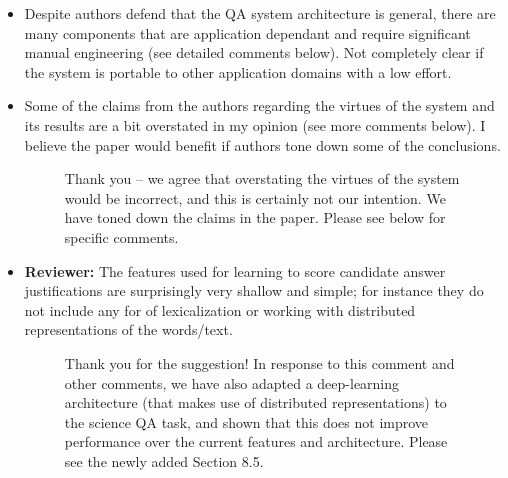\documentclass[10pt]{article}
\begin{document}
\begin{itemize}
\item Despite authors defend that the QA system architecture is general, there
are many components that are application dependant and require significant
manual engineering (see detailed comments below). Not completely clear if
the system is portable to other application domains with a low effort.

\item Some of the claims from the authors regarding the virtues of the system
and its results are a bit overstated in my opinion (see more comments
below). I believe the paper would benefit if authors tone down some of the
conclusions.

\begin{figure}[H]
\caption{Thank you -- we agree that overstating the virtues of the system would be incorrect, and this is certainly not our intention. We have toned down the claims in the paper. Please see below for specific comments.}
\end{figure}

\item \textbf{Reviewer:} The features used for learning to score candidate answer justifications
are surprisingly very shallow and simple; for instance they do not include
any for of lexicalization or working with distributed representations of the
words/text.

\begin{figure}[H]
\caption{Thank you for the suggestion!
In response to this comment and other comments, we have also adapted a deep-learning architecture (that makes use of distributed representations) to the science QA task, and shown that this does not improve performance over the current features and architecture. Please see the newly added Section 8.5.}
\end{figure}

\end{itemize}

\end{document}

